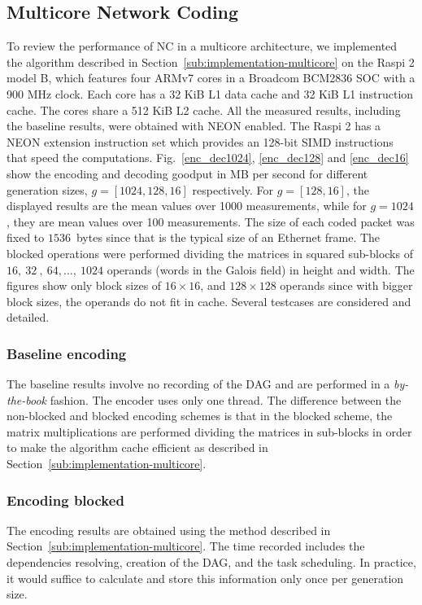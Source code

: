 \subsection{Multicore Network Coding}
\label{subs:multicore-network-coding}

To review the performance of \ac{NC} in a multicore architecture,
we implemented the algorithm described in
Section~\ref{sub:implementation-multicore} on the \ac{Raspi} 2 model B, which
features four ARMv7 cores in a Broadcom BCM2836 \ac{SOC} with a 900 MHz clock.
Each core has a 32 KiB L1 data cache and 32 KiB L1 instruction cache. The cores
share a 512 KiB L2 cache. All the measured results, including the baseline
results, were obtained with
NEON enabled.
The \ac{Raspi} 2 has a NEON extension instruction set which
provides an 128-bit \ac{SIMD} instructions that speed the computations.
Fig.~\ref{enc_dec1024}, \ref{enc_dec128} and \ref{enc_dec16} show the
encoding and decoding goodput in MB per second for different generation sizes,
$g = [1024, 128, 16]$ respectively. For $g = [128, 16]$, the displayed results
are the mean values over 1000 measurements, while for $g=1024$, they are mean
values over 100 measurements. The size of each coded packet was fixed to
$1536$~bytes since that is the typical size of an Ethernet frame. The blocked
operations were performed dividing the matrices in squared sub-blocks of $16,\
32\ ,\ 64,\ldots,\ 1024$ operands (words in the Galois field) in height and
width. The figures show only block sizes of $16 \times 16$, and $128 \times 128$
operands since with bigger block sizes, the operands do not fit in cache.
Several testcases are considered and detailed.

\subsubsection{Baseline encoding}
The baseline results involve no recording of the \ac{DAG} and are performed in a
\emph{by-the-book} fashion. The encoder uses only one thread. The difference
between the non-blocked and blocked encoding schemes is that in the blocked
scheme, the matrix multiplications are performed dividing the matrices in
sub-blocks in order to make the algorithm cache efficient as described in
Section~\ref{sub:implementation-multicore}.

\subsubsection{Encoding blocked}
The encoding results are obtained using the method described in
Section~\ref{sub:implementation-multicore}. The time recorded includes the
dependencies resolving, creation of the \ac{DAG}, and the task scheduling. In
practice, it would suffice to calculate and store this information only once per
generation size.

